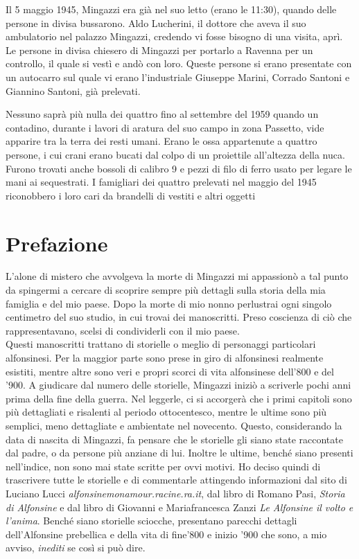 \documentclass[10pt]{memoir} %
\begin{document}
\noindent Il 5 maggio 1945, Mingazzi era già nel suo letto (erano le 11:30), quando delle persone in divisa bussarono. Aldo Lucherini, il dottore che aveva il suo ambulatorio nel palazzo Mingazzi, credendo vi fosse bisogno di una visita, aprì. Le persone in divisa chiesero di Mingazzi per portarlo a Ravenna per un controllo, il quale si vestì e andò con loro. Queste persone si erano presentate con un autocarro sul quale vi erano l'industriale Giuseppe Marini, Corrado Santoni e Giannino Santoni, già prelevati.

\noindent Nessuno saprà più nulla dei quattro fino al settembre del 1959 quando un contadino, durante i lavori di aratura del suo campo in zona Passetto, vide apparire tra la terra dei resti umani. Erano le ossa appartenute a quattro persone, i cui crani erano bucati dal colpo di un proiettile all’altezza della nuca. Furono trovati anche bossoli di calibro 9 e pezzi di filo di ferro usato per legare le mani ai sequestrati. I famigliari dei quattro prelevati nel maggio del 1945 riconobbero i loro cari da brandelli di vestiti e altri oggetti



\chapter*{Prefazione}
L'alone di mistero che avvolgeva la morte di Mingazzi mi appassionò a tal punto da spingermi a cercare di scoprire sempre più dettagli sulla storia della mia famiglia e del mio paese. Dopo la morte di mio nonno perlustrai ogni singolo centimetro del suo studio, in cui trovai dei manoscritti. Preso coscienza di ciò che rappresentavano, scelsi di condividerli con il mio paese.
\\Questi manoscritti trattano di storielle o meglio di personaggi particolari alfonsinesi. Per la maggior parte sono prese in giro di alfonsinesi realmente esistiti, mentre altre sono veri e propri scorci di vita alfonsinese dell'800 e del '900. A giudicare dal numero delle storielle, Mingazzi iniziò a scriverle pochi anni prima della fine della guerra. Nel leggerle, ci si accorgerà che i primi capitoli sono più dettagliati e risalenti al periodo ottocentesco, mentre le ultime sono più semplici, meno dettagliate e ambientate nel novecento. Questo, considerando la data di nascita di Mingazzi, fa pensare che le storielle gli siano state raccontate dal padre, o da persone più anziane di lui. Inoltre le ultime, benché siano presenti nell'indice, non sono mai state scritte per ovvi motivi. Ho deciso quindi di trascrivere tutte le storielle e di commentarle attingendo informazioni dal sito di Luciano Lucci \emph{alfonsinemonamour.racine.ra.it}, dal libro di Romano Pasi, \emph{Storia di Alfonsine} e dal libro di Giovanni e Mariafrancesca Zanzi \emph{Le Alfonsine il volto e l'anima}. Benché siano storielle sciocche, presentano parecchi dettagli dell'Alfonsine prebellica e della vita di fine'800 e inizio '900 che sono, a mio avviso, \emph{inediti} se così si può dire.
\end{document}
